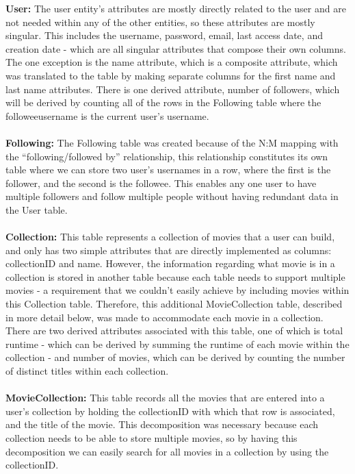 \documentclass[12pt]{article}
\begin{document}
    \textbf{User:} The user entity’s attributes are mostly directly related to the user and are not needed within any of the other entities, so these attributes are mostly singular. This includes the username, password, email, last access date, and creation date - which are all singular attributes that compose their own columns. The one exception is the name attribute, which is a composite attribute, which was translated to the table by making separate columns for the first name and last name attributes. There is one derived attribute, number of followers, which will be derived by counting all of the rows in the Following table where the followee\textunderscore username is the current user’s username. \\ \\
    \textbf{Following:} The Following table was created because of the N:M mapping with the “following/followed by” relationship, this relationship constitutes its own table where we can store two user’s usernames in a row, where the first is the follower, and the second is the followee. This enables any one user to have multiple followers and follow multiple people without having redundant data in the User table. \\ \\
    \textbf{Collection:} This table represents a collection of movies that a user can build, and only has two simple attributes that are directly implemented as columns: collectionID and name. However, the information regarding what movie is in a collection is stored in another table because each table needs to support multiple movies - a requirement that we couldn't easily achieve by including movies within this Collection table. Therefore, this additional Movie\textunderscore Collection table, described in more detail below, was made to accommodate each movie in a collection. There are two derived attributes associated with this table, one of which is total runtime - which can be derived by summing the runtime of each movie within the collection - and number of movies, which can be derived by counting the number of distinct titles within each collection. \\ \\
    \textbf{Movie\textunderscore Collection:} This table records all the movies that are entered into a user's collection by holding the collectionID with which that row is associated, and the title of the movie. This decomposition was necessary because each collection needs to be able to store multiple movies, so by having this decomposition we can easily search for all movies in a collection by using the collectionID. \\ \\
\end{document}
